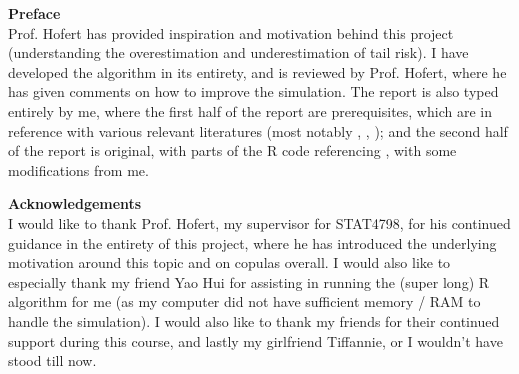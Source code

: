 \documentclass[12pt]{report}
\newcommand{\1}{\mathbf{1}}
\begin{document}
\newpage
\begin{flushleft}
\LARGE
\textbf{Preface} \\
\normalsize
\vspace{1cm}
Prof. Hofert has provided inspiration and motivation behind this project (understanding the overestimation and underestimation of tail risk). I have developed the algorithm in its entirety, and is reviewed by Prof. Hofert, where he has given comments on how to improve the simulation. The report is also typed entirely by me, where the first half of the report are prerequisites, which are in reference with various relevant literatures (most notably \cite{HofertBook}, \cite{KojadinovicYi2024Smooth}, \cite{SegersEBC}); and the second half of the report is original, with parts of the R code referencing \cite{copulaRPackage2023}, \cite{KojadinovicYi2024Smooth} with some modifications from me. 
\end{flushleft}

\newpage
\begin{flushleft}
\LARGE
\textbf{Acknowledgements} \\
\normalsize
\vspace{1cm}
I would like to thank Prof. Hofert, my supervisor for STAT4798, for his continued guidance in the entirety of this project, where he has introduced the underlying motivation around this topic and on copulas overall. I would also like to especially thank my friend Yao Hui for assisting in running the (super long) R algorithm for me (as my computer did not have sufficient memory / RAM to handle the simulation). I would also like to thank my friends for their continued support during this course, and lastly my girlfriend Tiffannie, or I wouldn't have stood till now.
\end{flushleft}

\tableofcontents
\renewcommand\thesection{\arabic{section}}
\end{document}

